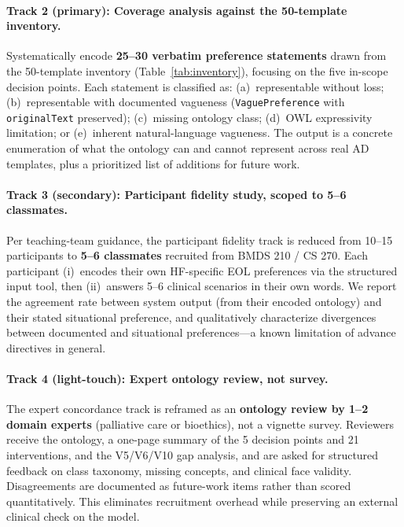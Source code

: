 \documentclass[11pt]{article}
\newcommand{\onto}[1]{\texttt{#1}}
\begin{document}
\paragraph{Track 2 (primary): Coverage analysis against the 50-template inventory.}
Systematically encode \textbf{25--30 verbatim preference statements} drawn from the 50-template inventory (Table~\ref{tab:inventory}), focusing on the five in-scope decision points. Each statement is classified as: (a)~representable without loss; (b)~representable with documented vagueness (\onto{VaguePreference} with \onto{originalText} preserved); (c)~missing ontology class; (d)~OWL expressivity limitation; or (e)~inherent natural-language vagueness. The output is a concrete enumeration of what the ontology can and cannot represent across real AD templates, plus a prioritized list of additions for future work.

\paragraph{Track 3 (secondary): Participant fidelity study, scoped to 5--6 classmates.}
Per teaching-team guidance, the participant fidelity track is reduced from 10--15 participants to \textbf{5--6 classmates} recruited from BMDS 210 / CS 270. Each participant (i)~encodes their own HF-specific EOL preferences via the structured input tool, then (ii)~answers 5--6 clinical scenarios in their own words. We report the agreement rate between system output (from their encoded ontology) and their stated situational preference, and qualitatively characterize divergences between documented and situational preferences---a known limitation of advance directives in general.

\paragraph{Track 4 (light-touch): Expert ontology review, not survey.}
The expert concordance track is reframed as an \textbf{ontology review by 1--2 domain experts} (palliative care or bioethics), not a vignette survey. Reviewers receive the ontology, a one-page summary of the 5 decision points and 21 interventions, and the V5/V6/V10 gap analysis, and are asked for structured feedback on class taxonomy, missing concepts, and clinical face validity. Disagreements are documented as future-work items rather than scored quantitatively. This eliminates recruitment overhead while preserving an external clinical check on the model.
\end{document}
